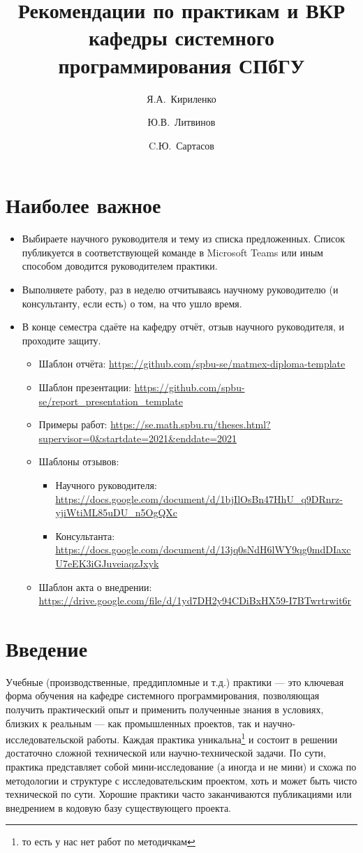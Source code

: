 \documentclass{article}
\title{Рекомендации по практикам и ВКР кафедры системного программирования СПбГУ}
\author{Я.А.~Кириленко \and Ю.В.~Литвинов \and C.Ю.~Сартасов  }
\date{}
\begin{document}
\maketitle

\section*{Наиболее важное}

\begin{itemize}
    \item Выбираете научного руководителя и тему из списка предложенных. Список публикуется в соответствующей команде в Microsoft Teams или иным способом доводится руководителем практики.
    \item Выполняете работу, раз в неделю отчитываясь научному руководителю (и консультанту, если есть) о том, на что ушло время.
    \item В конце семестра сдаёте на кафедру отчёт, отзыв научного руководителя, и проходите защиту.
    \begin{itemize}
        \item Шаблон отчёта: \url{https://github.com/spbu-se/matmex-diploma-template}
        \item Шаблон презентации: \url{https://github.com/spbu-se/report_presentation_template}
        \item Примеры работ: \url{https://se.math.spbu.ru/theses.html?supervisor=0&startdate=2021&enddate=2021}
        \item Шаблоны отзывов:
        \begin{itemize}
            \item Научного руководителя: \url{https://docs.google.com/document/d/1bjIlOsBn47HhU_q9DRnrz-yjiWtiML85uDU_n5OgQXc}
            \item Консультанта: \url{https://docs.google.com/document/d/13jq0sNdH6lWY9qg0mdDIaxcU7eEK3iGJuveiaqzJxyk}
        \end{itemize}
        \item Шаблон акта о внедрении: \url{https://drive.google.com/file/d/1yd7DH2y94CDiBxHX59-I7BTwrtrwit6r}
    \end{itemize}
\end{itemize}

\section{Введение}

Учебные (производственные, преддипломные и т.д.) практики --- это ключевая форма обучения на кафедре системного программирования, позволяющая получить практический опыт и применить полученные знания в условиях, близких к реальным --- как промышленных проектов, так и научно-исследовательской работы. Каждая практика уникальна\footnote{то есть у нас нет работ по методичкам} и состоит в решении достаточно сложной технической или научно-технической задачи. По сути, практика представляет собой мини-исследование (а иногда и не мини) и схожа по методологии и структуре с исследовательским проектом, хоть и может быть чисто технической по сути. Хорошие практики часто заканчиваются публикациями или внедрением в кодовую базу существующего проекта.
\end{document}
